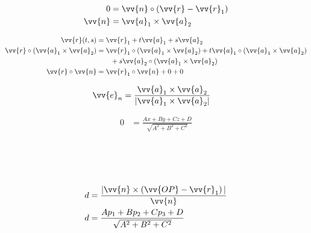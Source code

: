 \begin{boxleft}
\\
\\
\end{boxleft}\begin{boxrightshaded}
\begin{align} 
0&=\vv{n}\circ\left(\vv{r}-\vv{r}_1\right)\\
\vv{n}&=\vv{a}_1\times\vv{a}_2
\end{align}\end{boxrightshaded}

\begin{boxleft}
\end{boxleft}\begin{boxrightshaded}
\begin{align} 
\vv{r}(t,s) &=\vv{r}_1+t\vv{a}_1+s\vv{a}_2\\
\vv{r}\circ(\vv{a}_1\times\vv{a}_2)&=\vv{r}_1\circ(\vv{a}_1\times\vv{a}_2)+t\vv{a}_1\circ(\vv{a}_1\times\vv{a}_2)\\
&\qquad +s\vv{a}_2\circ(\vv{a}_1\times\vv{a}_2)\\
\vv{r}\circ\vv{n}&=\vv{r}_1\circ\vv{n}+0+0
\end{align}\end{boxrightshaded}

\begin{boxleft}
\end{boxleft}\begin{boxrightshaded}
\begin{align} 
\vv{e}_n&=\frac{\vv{a}_1\times\vv{a}_2}{|\vv{a}_1\times\vv{a}_2|}
\end{align}\end{boxrightshaded}

\begin{boxleft}
\end{boxleft}\begin{boxrightshaded}
\begin{align} 
0&=\frac{Ax+By+Cz+D}{\sqrt{A^2+B^2+C^2}}
\end{align}\end{boxrightshaded}


\begin{boxleft}
\\
\\
\\
\end{boxleft}\begin{boxrightshaded}
\begin{align} 
d&=\frac{|\vv{n}\times\left(\vv{OP}-\vv{r}_1\right)|}{\vv{n}}\\
d&=\frac{Ap_1+Bp_2+Cp_3+D}{\sqrt{A^2+B^2+C^2}}
\end{align}\end{boxrightshaded}


